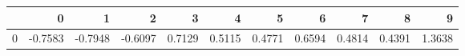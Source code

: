 \begin{tabular}{lrrrrrrrrrr}
\toprule
{} &       0 &       1 &       2 &       3 &       4 &       5 &       6 &       7 &       8 &       9 \\
\midrule
0 & -0.7583 & -0.7948 & -0.6097 &  0.7129 &  0.5115 &  0.4771 &  0.6594 &  0.4814 &  0.4391 &  1.3638 \\
\bottomrule
\end{tabular}
